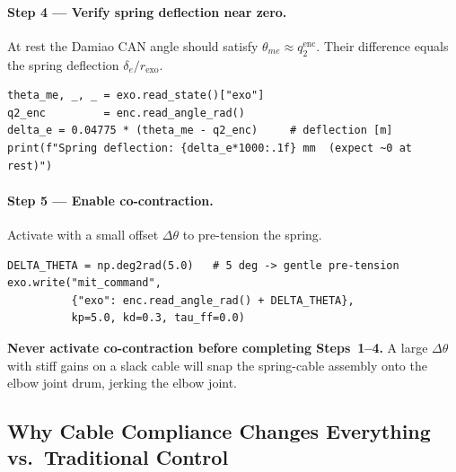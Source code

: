 \documentclass[11pt,a4paper]{article}
\begin{document}
\paragraph{Step 4 --- Verify spring deflection near zero.}
At rest the Damiao CAN angle should satisfy $\theta_{me} \approx q_2^{\mathrm{enc}}$.
Their difference equals the spring deflection $\delta_e / r_{\mathrm{exo}}$.
\begin{lstlisting}[caption={Check spring deflection at rest.}]
theta_me, _, _ = exo.read_state()["exo"]
q2_enc         = enc.read_angle_rad()
delta_e = 0.04775 * (theta_me - q2_enc)     # deflection [m]
print(f"Spring deflection: {delta_e*1000:.1f} mm  (expect ~0 at rest)")
\end{lstlisting}

\paragraph{Step 5 --- Enable co-contraction.}
Activate with a small offset $\Delta\theta$ to pre-tension the spring.
\begin{lstlisting}[caption={Enable exo co-contraction.}]
DELTA_THETA = np.deg2rad(5.0)   # 5 deg -> gentle pre-tension
exo.write("mit_command",
          {"exo": enc.read_angle_rad() + DELTA_THETA},
          kp=5.0, kd=0.3, tau_ff=0.0)
\end{lstlisting}

\begin{warnbox}
  \textbf{Never activate co-contraction before completing Steps~1--4.}
  A large $\Delta\theta$ with stiff gains on a slack cable will snap the
  spring-cable assembly onto the elbow joint drum, jerking the elbow joint.
\end{warnbox}

\subsection{Why Cable Compliance Changes Everything vs.\ Traditional Control}
\label{sec:compare}
\end{document}
